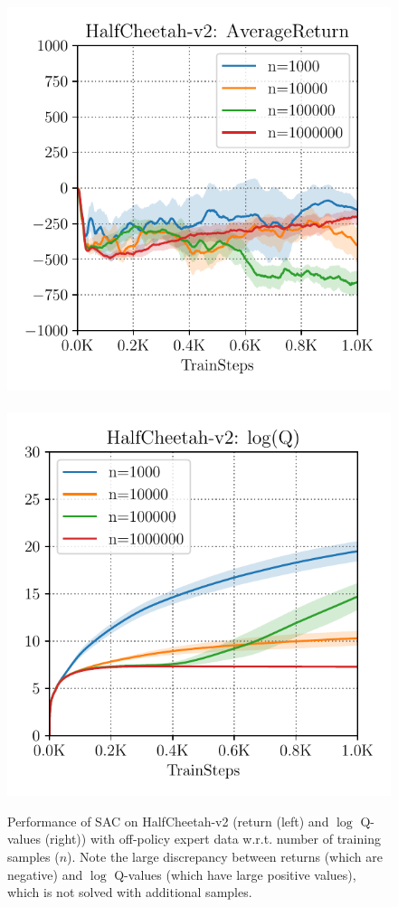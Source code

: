 \begin{figure}
\vspace{-10pt}
\begin{center}
\vspace{-0.1in}
    \includegraphics[width=0.48\linewidth]{chapters/bear/images/cheetah_divergence.pdf}
    ~
    \includegraphics[width=0.48\linewidth]{chapters/bear/images/cheetah_divergence_q_val.pdf}
  \end{center}
 \vspace{-10pt}
  \caption{ \footnotesize Performance of SAC on HalfCheetah-v2 (return (left) and $\log$ Q-values (right)) with off-policy expert data w.r.t. number of training samples ($n$). Note the large discrepancy between returns (which are negative) and $\log$ Q-values (which have large positive values), which is not solved with additional samples.} 
 \vspace{-15pt}
 \label{fig:divergence}
\end{figure}

